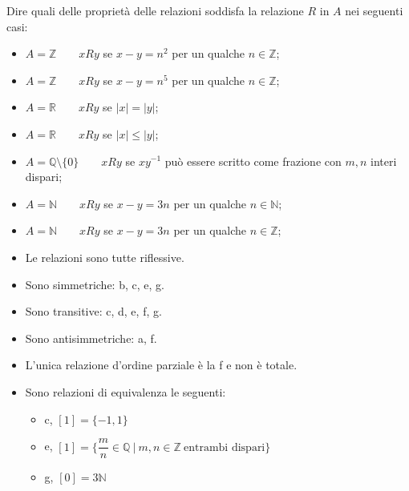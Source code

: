 \begin{esercizio}
  Dire quali delle proprietà delle relazioni soddisfa la relazione $R$ in $A$ nei seguenti casi:

\begin{itemize}\setlength\itemsep{1em}

\item[a)] $A=\mathbb{Z}\qquad xRy$ se $x-y=n^2$ per un qualche $n\in\mathbb{Z}$;

\item[b)] $A=\mathbb{Z}\qquad xRy$ se $x-y=n^5$ per un qualche $n\in\mathbb{Z}$;

\item[c)] $A=\mathbb{R}\qquad xRy$ se $|x|=|y|$;

\item[d)] $A=\mathbb{R}\qquad xRy$ se $|x|\leq|y|$;

\item[e)] $A=\mathbb{Q}\setminus \{0\}\qquad xRy$ se $xy^{-1}$ può essere scritto come frazione con $m, n$ interi dispari;

\item[f)] $A=\mathbb{N}\qquad xRy$ se $x-y=3n$ per un qualche $n\in\mathbb{N}$;

\item[g)] $A=\mathbb{N}\qquad xRy$ se $x-y=3n$ per un qualche $n\in\mathbb{Z}$;

\end{itemize}
  
\end{esercizio}

\begin{soluzione}
    



\begin{itemize}\setlength\itemsep{1em}

\item Le relazioni sono tutte riflessive.

\item Sono simmetriche: b, c, e, g.

\item Sono transitive: c, d, e, f, g.

\item Sono antisimmetriche: a, f.

\item L'unica relazione d'ordine parziale è la f e non è totale.

\item Sono relazioni di equivalenza le seguenti:
\begin{itemize}
\item c, $[1]=\{-1,1\}$
\item e, $[1]=\bigg\{\dfrac{m}{n}\in\mathbb{Q}\ |\ m,n\in\mathbb{Z}\ \text{entrambi\ dispari}\bigg\}$
\item g, $[0]=3\mathbb{N}$
\end{itemize}

\end{itemize}
\end{soluzione}



